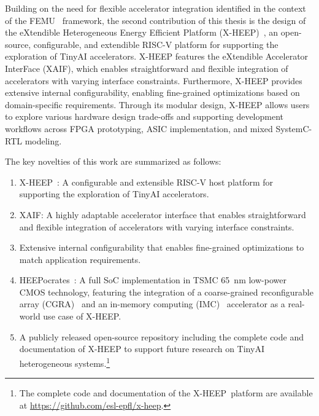\begin{itemize}
            Building on the need for flexible accelerator integration identified in the context of the \mbox{FEMU}~\cite{femu} framework, the second contribution of this thesis is the design of the eXtendible Heterogeneous Energy Efficient Platform (\mbox{X-HEEP})~\cite{x-heep}, an open-source, configurable, and extendible RISC-V platform for supporting the exploration of TinyAI accelerators. \mbox{X-HEEP} features the eXtendible Accelerator InterFace (XAIF), which enables straightforward and flexible integration of accelerators with varying interface constraints. Furthermore, \mbox{X-HEEP} provides extensive internal configurability, enabling fine-grained optimizations based on domain-specific requirements. Through its modular design, \mbox{X-HEEP} allows users to explore various hardware design trade-offs and supporting development workflows across FPGA prototyping, ASIC implementation, and mixed SystemC-RTL modeling.
        
            The key novelties of this work are summarized as follows:
        
            \begin{enumerate}[label=(\alph*)]
                \item \mbox{X-HEEP}~\cite{x-heep}: A configurable and extensible RISC-V host platform for supporting the exploration of TinyAI accelerators.
        
                \item \mbox{XAIF}: A highly adaptable accelerator interface that enables straightforward and flexible integration of accelerators with varying interface constraints.

                \item Extensive internal configurability that enables fine-grained optimizations to match application requirements.
        
                \item \mbox{HEEPocrates}~\cite{heepocrates}: A full SoC implementation in TSMC \SI{65}{\nano\meter} low-power CMOS technology, featuring the integration of a coarse-grained reconfigurable array (CGRA)~\cite{oe-cgra} and an in-memory computing (IMC)~\cite{blade} accelerator as a real-world use case of \mbox{X-HEEP}.
        
                \item A publicly released open-source repository including the complete code and documentation of \mbox{X-HEEP} to support future research on TinyAI heterogeneous systems.\footnote{The complete code and documentation of the \mbox{X-HEEP platform} are available at \url{https://github.com/esl-epfl/x-heep}.}
            \end{enumerate}


\end{itemize}
